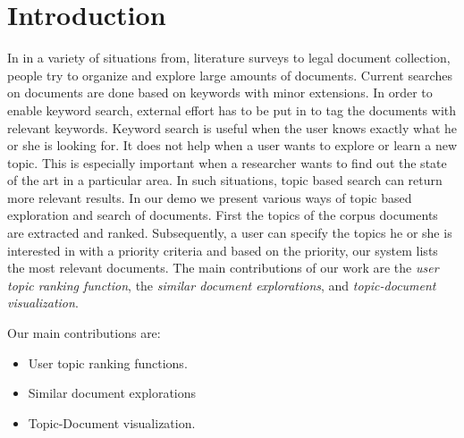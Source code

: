\section{Introduction}

In in a variety of situations from, literature surveys to legal document
collection, people try to organize and explore large amounts of documents.
Current searches on documents are done based on keywords with minor
extensions. In order to enable keyword search, external effort has to be put in
to tag the documents with relevant keywords. 
Keyword search is useful when the user knows exactly what he or she is looking
for. It does not help when a user wants to explore or learn a new topic. This
is especially important when a researcher wants to find out the state of the
art in a particular area. In such situations, topic based search can return more relevant results. In our
demo we present various ways of topic based exploration and search of
documents. First the topics of the corpus documents are extracted and ranked.
Subsequently, a user can specify the topics he or she is interested in with a
priority criteria and based on the priority, our system lists the most relevant
documents. The main contributions of our work are the \emph{user topic ranking
function}, the \emph{similar document explorations}, and \emph{topic-document
visualization}.


Our main contributions are:
\begin{itemize}
\item User topic ranking functions.
\item Similar document explorations
\item Topic-Document visualization.
\end{itemize}
